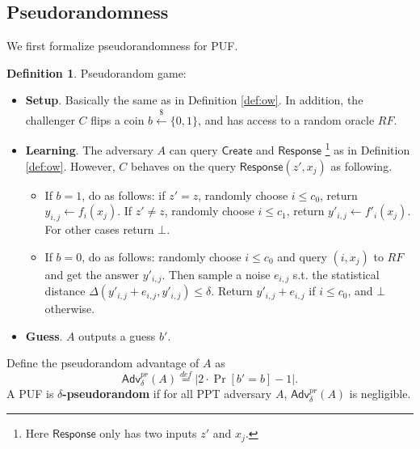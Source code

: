 \documentclass[12pt]{article}
\newcommand{\eqdef}{\stackrel{def}{=}}
\newcommand{\bits}{\{0,1\}}
\newcommand{\getsr}{\stackrel{\$}{\gets}}
\newcommand{\Adv}{\mathsf{Adv}}
\newcommand{\Create}{\mathsf{Create}}
\newcommand{\Response}{\mathsf{Response}}
\theoremstyle{definition}
\newtheorem{definition}[theorem]{Definition}
\begin{document}
\subsection{Pseudorandomness}
We first formalize pseudorandomness for PUF.
\begin{definition}
Pseudorandom game:
\begin{itemize}
\item {\bf Setup}. Basically the same as in Definition \ref{def:ow}. In addition, the challenger $C$ flips a coin $b \getsr \bits$, and has access to a random oracle $RF$.
\item {\bf Learning}. The adversary $A$ can query $\Create$ and $\Response$ \footnote{Here $\Response$ only has two inputs $z'$ and $x_j$.} as in Definition \ref{def:ow}. However, $C$ behaves on the query $\Response(z', x_j)$ as following.
	\begin{itemize}
	\item If $b=1$, do as follows: if $z'=z$, randomly choose $i \leq c_0$, return $y_{i,j} \gets f_i(x_j)$. If $z'\not= z$, randomly choose $i \leq c_1$, return $y'_{i,j} \gets f'_i(x_j)$. For other cases return $\bot$.
	\item If $b=0$, do as follows: randomly choose $i \leq c_0$ and query $(i, x_j)$ to $RF$ and get the answer $y'_{i,j}$. Then sample a noise $e_{i,j}$ s.t. the statistical distance $\Delta(y'_{i,j} + e_{i,j}, y'_{i,j}) \leq \delta$. Return $y'_{i,j} + e_{i,j}$ if $i\leq c_0$, and $\bot$ otherwise.
	\end{itemize}
\item {\bf Guess}. $A$ outputs a guess $b'$.
\end{itemize}
Define the pseudorandom advantage of $A$ as
$$\Adv_{\delta}^{pr}(A) \eqdef |2\cdot \Pr[b'=b] - 1|.$$
A PUF is {\bf $\delta$-pseudorandom} if for all PPT adversary $A$, $\Adv_{\delta}^{pr}(A)$ is negligible.
\end{definition}
\end{document}
